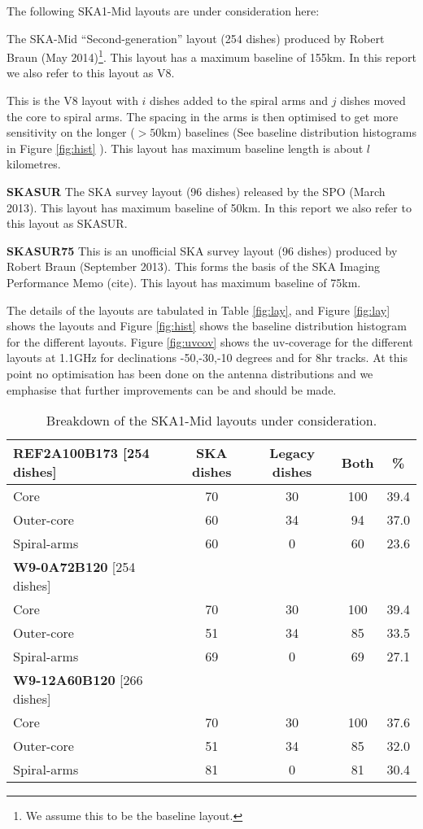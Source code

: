 \documentclass[sfheadings,a4paper,times,9pt,floats,floatfix]{article}
\begin{document}
The following SKA1-Mid layouts are under consideration here:
\begin{description}
\item[{\bf V8A100B155}] The SKA-Mid ``Second-generation'' layout (254 dishes) produced by Robert Braun (May
2014)\footnote{We assume this to be the baseline layout.}. This layout has a maximum baseline of 155km. In this report
we also refer to this
layout as V8.
\item[{\bf W8-$i$C$j$B$l$}] This is the V8 layout with $ i$ dishes added
to the spiral arms and $j$ dishes moved the core to spiral arms. The spacing in the arms is then optimised  to get
more sensitivity on the longer ($>50$km) baselines (See baseline distribution histograms in Figure \ref{fig:hist} ).
This layout has maximum baseline length is about $l$ kilometres.
\item {\bf SKASUR} The SKA survey layout (96 dishes) released by the SPO (March 2013). This layout
has maximum baseline of 50km. In this report we also refer to this layout as SKASUR. 
\item {\bf SKASUR75} This is an unofficial SKA survey layout (96 dishes) produced by Robert Braun
(September 2013). This forms the basis of the SKA Imaging Performance Memo (cite). This layout has maximum baseline of
75km.
\end{description}
The details of the layouts are tabulated in Table \ref{fig:lay}, and Figure \ref{fig:lay} shows the layouts and Figure
\ref{fig:hist} shows the baseline distribution histogram for the different layouts. Figure \ref{fig:uvcov} shows the uv-coverage
for the different layouts at 1.1GHz for declinations -50,-30,-10 
degrees and for 8hr tracks. At this point no optimisation has been
done on the antenna distributions and we emphasise that further improvements can be and should be made.
\begin{table}[H]
\centering
 \tiny{
 \begin{tabular}{l|cccc}\hline
 {\bf REF2A100B173} [254 dishes] & SKA dishes&  Legacy dishes & Both & \% \\\hline\hline
  Core & 70 & 30 & 100 & 39.4 \\
 Outer-core & 60 & 34 & 94 & 37.0 \\
 Spiral-arms & 60 & 0 & 60 & 23.6 \\\hline\hline
  {\bf W9-0A72B120} [254 dishes] &  & &  & \\\hline\hline
  Core & 70 & 30 & 100 & 39.4 \\
 Outer-core & 51 & 34 & 85 & 33.5 \\
 Spiral-arms & 69 & 0 & 69 & 27.1 \\\hline\hline
  {\bf W9-12A60B120} [266 dishes] &  & &  & \\\hline\hline
  Core & 70 & 30 & 100 & 37.6 \\
 Outer-core & 51 & 34 & 85 & 32.0 \\
 Spiral-arms & 81 & 0 & 81 & 30.4 \\\hline\hline
  \end{tabular}}
 \caption{Breakdown of the SKA1-Mid layouts under consideration.}\label{tab:lay}
\end{table}
\end{document}
